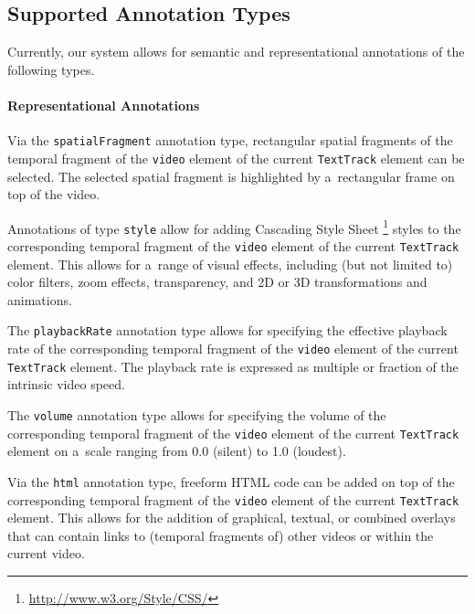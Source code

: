 \documentclass{sig-alternate}
\newcommand{\inlinelistingsize}{\fontsize{8pt}{11pt}}
\let\oldurl\url
\renewcommand{\url}[1]{\inlinelistingsize\oldurl{#1}}
\begin{document}
\subsection{Supported Annotation Types}

Currently, our system allows for semantic and representational
annotations of the following types.

\paragraph{Representational Annotations}

\begin{description}[leftmargin=*]
  \item[Spatial Fragments:] Via the \texttt{spatialFragment}
    annotation type, rectangular spatial fragments
    of the temporal fragment of the \texttt{video} element
    of the current \texttt{TextTrack} element can be selected.
    The selected spatial fragment is highlighted by a~rectangular
    frame on top of the video.
  \item[Style:] Annotations of
    type \texttt{style} allow for adding Cascading Style Sheet%
    \footnote{\url{http://www.w3.org/Style/CSS/}}
    styles to the corresponding temporal fragment of the
    \texttt{video} element of the current
    \texttt{TextTrack} element.
    This allows for a~range of visual effects,
    including (but not limited to) color filters,
    zoom effects, transparency, and 2D or 3D transformations
    and animations. 
  \item[Playback Rate:] The \texttt{playbackRate}
    annotation type allows for specifying the effective
    playback rate of the corresponding temporal fragment of the
    \texttt{video} element of the current
    \texttt{TextTrack} element.
    The playback rate is expressed as multiple or fraction
    of the intrinsic video speed.
  \item[Volume:] The \texttt{volume} annotation type allows for
    specifying the volume of the corresponding
    temporal fragment of the
    \texttt{video} element of the current
    \texttt{TextTrack} element on a~scale
    ranging from 0.0 (silent) to 1.0 (loudest).
  \item[HTML:] Via the \texttt{html} annotation type,
    freeform HTML code can be added on top of the
    corresponding temporal fragment of the
    \texttt{video} element of the
    current \texttt{TextTrack} element.
    This allows for the addition of graphical,
    textual, or combined overlays that can contain
    links to (temporal fragments of)
    other videos or within the current video.
\end{description}
\end{document}
